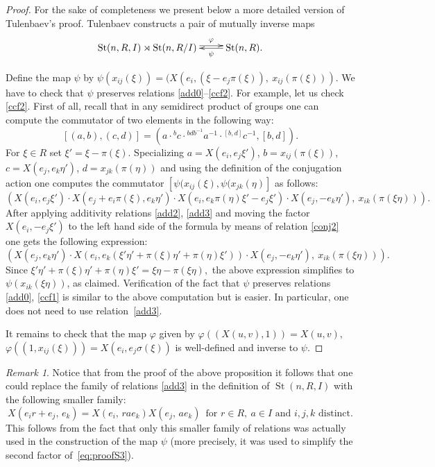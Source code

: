 \documentclass[11pt]{amsart}
\theoremstyle{plain} \declaretheorem[name=Theorem, Refname={Theorem,Theorems}]{tm} \Crefname{tm}{Theorem}{Theorems}
\numberwithin{equation}{section}
\theoremstyle{definition} \newtheorem{df}[lm]{Definition} \Crefname{df}{Definition}{Definitions}
\theoremstyle{remark} \newtheorem{rk}[lm]{Remark} \Crefname{rk}{Remark}{Remarks}
\newcommand{\St}{\mathop{\mathrm{St}}\nolimits}
\begin{document}
\begin{proof} For the sake of completeness we present below a more detailed version of Tulenbaev's proof.
Tulenbaev constructs a pair of mutually inverse maps
$$\xymatrix{ \St(n, R, I) \rtimes \St(n, R/I) \ar@<0.6ex>[r]^-\varphi &  \ar[l]^-\psi \St(n, R).}$$

Define the map $\psi$ by $\psi(x_{ij}(\xi)) = (X(e_i, (\xi - e_j\pi(\xi)),\ x_{ij}(\pi(\xi)))$. 
We have to check that $\psi$ preserves relations \eqref{add0}--\eqref{ccf2}.
For example, let us check \eqref{ccf2}. 
First of all, recall that in any semidirect product of groups one can compute the commutator of two elements in the following way:
$$[(a, b), (c, d)] = (a \cdot {}^bc \cdot {}^{bdb^{-1}}a^{-1} \cdot {}^{[b, d]}c^{-1} , [b, d]).$$
For $\xi\in R$ set $\xi' = \xi - \pi(\xi)$.
Specializing $a = X(e_i,  e_j\xi')$, $b = x_{ij}(\pi(\xi))$, $c = X(e_j, e_k\eta')$, $d = x_{jk}(\pi(\eta))$ and using the definition of the conjugation action 
one computes the commutator $[\psi(x_{ij}(\xi), \psi(x_{jk}(\eta)]$ as follows:
\setcounter{equation}{2}
\begin{equation} \left(X(e_i,  e_j\xi') \cdot X(e_j + e_i\pi(\xi), e_k\eta') \cdot X(e_i,  e_k\pi(\eta)\xi' -  e_j\xi') \cdot X(e_j, -e_k\eta'),\ x_{ik}(\pi(\xi\eta))\right). \label{eq:proofS3}\end{equation}
\setcounter{lm}{3}
After applying additivity relations \eqref{add2}, \eqref{add3} and moving the factor $X(e_i, - e_j\xi')$ to the left hand side of the formula by means of relation \eqref{conj2}
one gets the following expression:
$$\left(X(e_j, e_k\eta') \cdot X(e_i, e_k(\xi' \eta' + \pi(\xi)\eta' + \pi(\eta)\xi')) \cdot X(e_j, -e_k\eta'),\ x_{ik}(\pi(\xi\eta))\right).$$
Since $\xi'\eta' + \pi(\xi)\eta' + \pi(\eta)\xi' = \xi\eta - \pi(\xi\eta),$ the above expression simplifies to $\psi(x_{ik}(\xi\eta))$, as claimed.
Verification of the fact that $\psi$ preserves relations \eqref{add0}, \eqref{ccf1} is similar to the above computation but is easier.
In particular, one does not need to use relation~\eqref{add3}.

It remains to check that the map $\varphi$ given by $\varphi\left((X(u, v), 1)\right) = X(u, v),$ $\varphi\left((1, x_{ij}(\xi))\right) = X(e_i, e_j\sigma(\xi))$
is well-defined and inverse to $\psi$.
\end{proof}

\begin{rk} \label{rk:T123'} Notice that from the proof of the above proposition it follows that one could replace the family of relations \eqref{add3}
in the definition of $\St(n, R, I)$ with the following smaller family:
\setcounter{equation}{2} \renewcommand{\theequation}{T\arabic{equation}'}
\begin{equation} X(e_ir+e_j,\,e_k)=X(e_i,\,rae_k)X(e_j,\,ae_k)\,\text{ for }r\in R,\ a\in I\text{ and } i,j,k\text{ distinct}. \label{add3'} \end{equation} 
This follows from the fact that only this smaller family of relations was actually used in the construction of the map $\psi$
(more precisely, it was used to simplify the second factor of~\eqref{eq:proofS3}). \end{rk}
\end{document}
